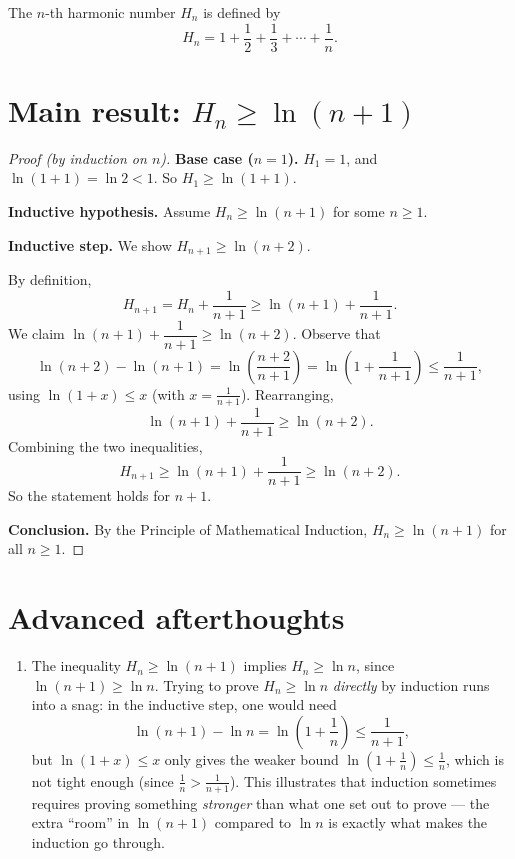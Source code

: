 \documentclass[11pt]{article}
\begin{document}
\begin{solution}
    The $n$-th harmonic number $H_n$ is defined by
\[
    H_n = 1+\frac12+\frac13+\cdots+\frac1n.
\]

\section*{Main result: $H_n \ge \ln(n+1)$}

\begin{proof}[Proof (by induction on $n$)]
    \textbf{Base case ($n=1$).} $H_1=1$, and $\ln(1+1)=\ln2<1$. So
    $H_1 \ge \ln(1+1)$.

    \textbf{Inductive hypothesis.} Assume $H_n \ge \ln(n+1)$ for some
    $n\ge1$.

    \textbf{Inductive step.} We show $H_{n+1}\ge\ln(n+2)$.

    By definition,
    \[
        H_{n+1} = H_n+\frac{1}{n+1} \ge \ln(n+1)+\frac{1}{n+1}.
    \]
    We claim $\ln(n+1)+\dfrac{1}{n+1} \ge \ln(n+2)$. Observe that
    \[
        \ln(n+2)-\ln(n+1) = \ln\left(\frac{n+2}{n+1}\right)
        = \ln\left(1+\frac{1}{n+1}\right) \le \frac{1}{n+1},
    \]
    using $\ln(1+x)\le x$ (with $x=\frac{1}{n+1}$). Rearranging,
    \[
        \ln(n+1)+\frac{1}{n+1} \ge \ln(n+2).
    \]
    Combining the two inequalities,
    \[
        H_{n+1} \ge \ln(n+1)+\frac{1}{n+1} \ge \ln(n+2).
    \]
    So the statement holds for $n+1$.

    \textbf{Conclusion.} By the Principle of Mathematical Induction,
    $H_n \ge \ln(n+1)$ for all $n\ge1$.
\end{proof}

\section*{Advanced afterthoughts}

\begin{enumerate}
\item The inequality $H_n\ge\ln(n+1)$ implies $H_n\ge\ln n$, since
    $\ln(n+1)\ge\ln n$. Trying to prove $H_n\ge\ln n$ \emph{directly}
    by induction runs into a snag: in the inductive step, one would
    need
    \[
        \ln(n+1)-\ln n = \ln\left(1+\frac1n\right) \le \frac{1}{n+1},
    \]
    but $\ln(1+x)\le x$ only gives the weaker bound
    $\ln(1+\frac1n)\le\frac1n$, which is not tight enough (since
    $\frac1n > \frac{1}{n+1}$). This illustrates that induction
    sometimes requires proving something \emph{stronger} than what
    one set out to prove --- the extra ``room'' in $\ln(n+1)$
    compared to $\ln n$ is exactly what makes the induction go
    through.


\end{enumerate}
\end{solution}
\end{document}
